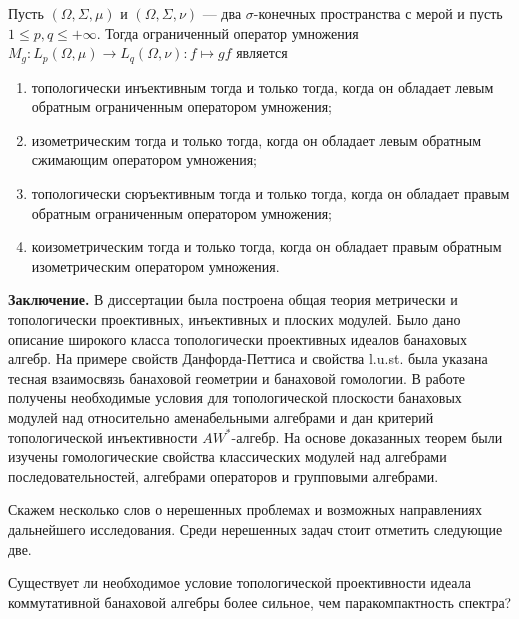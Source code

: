 \begin{theorem*}[3.3.12, 3.3.16, 3.3.19, 3.3.24] Пусть $(\Omega,\Sigma,\mu)$ и
    $(\Omega,\Sigma,\nu)$ --- два $\sigma$-конечных пространства с мерой и пусть
    $1\leq p, q\leq+\infty$. Тогда ограниченный оператор умножения
    $M_g:L_p(\Omega,\mu)\to L_q(\Omega,\nu):f\mapsto gf$ является
    \begin{enumerate}[label = (\roman*)]
        \item топологически инъективным тогда и только тогда, когда он обладает
              левым обратным ограниченным оператором умножения;

        \item изометрическим тогда и только тогда, когда он обладает левым
              обратным сжимающим оператором умножения;

        \item топологически сюръективным тогда и только тогда, когда он обладает
              правым обратным ограниченным оператором умножения;

        \item коизометрическим тогда и только тогда, когда он обладает правым
              обратным изометрическим оператором умножения.
    \end{enumerate}
\end{theorem*}

\textbf{Заключение.} В диссертации была построена общая теория метрически и
топологически проективных, инъективных и плоских модулей. Было дано описание
широкого класса топологически проективных идеалов банаховых алгебр. На примере
свойств Данфорда-Петтиса и свойства l.u.st. была указана тесная взаимосвязь
банаховой геометрии и банаховой гомологии. В работе получены необходимые условия
для топологической плоскости банаховых модулей над относительно аменабельными
алгебрами и дан критерий топологической инъективности $AW^*$-алгебр. На основе
доказанных теорем были изучены гомологические свойства классических модулей над
алгебрами последовательностей, алгебрами операторов и групповыми алгебрами.

Скажем несколько слов о нерешенных проблемах и возможных направлениях
дальнейшего исследования. Среди нерешенных задач стоит отметить следующие две.

\begin{problem*} Существует ли необходимое условие топологической проективности
    идеала коммутативной банаховой алгебры более сильное, чем паракомпактность
    спектра?
\end{problem*}

